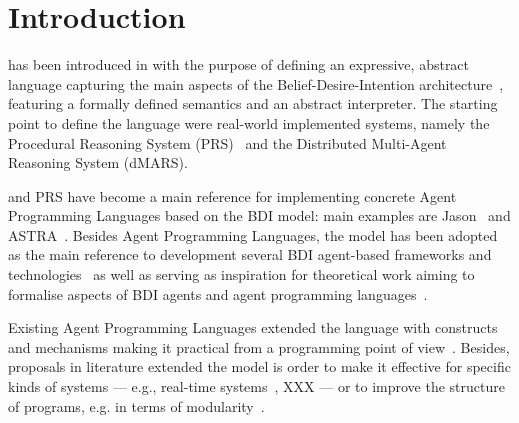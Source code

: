 \section{Introduction}
\label{sec:intro}


%
%
{\asl} has been introduced in \cite{Rao96}  with the purpose of defining an expressive, 
abstract language capturing the main aspects of the Belief-Desire-Intention architecture~\cite{Bratman88,Georgeff:1987:RRP:1863766.1863818}, featuring a formally defined semantics and an abstract interpreter.
%
The starting point to define the language were real-world implemented systems, namely the
Procedural Reasoning System (PRS)~\cite{Ingrand:1992:ARR:629535.629890} and the Distributed Multi-Agent Reasoning System (dMARS).
%

%
% 
{\asl}  and PRS have become a main reference for implementing concrete Agent Programming Languages 
based on the BDI model: 
%
main examples are Jason~\cite{jason06,bordini:07} and ASTRA~\cite{DBLP:conf/prima/CollierRL15}.
%
Besides Agent Programming Languages,  the {\asl}  model has been
adopted as the main reference to development several BDI agent-based
frameworks and technologies~\cite{BordiniMAPlpa,BordiniMAPlta} as well
as serving as inspiration for theoretical work aiming to formalise
aspects of BDI agents and agent programming
languages~\cite{SardinaThangCAN,LouiseAIL,BordiniMCAPL}.


%
%
Existing Agent Programming Languages extended the language with
constructs and mechanisms making it practical from a programming point
of view~\cite{jason06}.
%
Besides, proposals in literature extended the model is order to make
it effective for specific kinds of systems --- e.g., real-time
systems~\cite{Vikhorev:2011:APP:2030470.2030529}, XXX --- or to
improve the structure of programs, e.g. in terms of
modularity~\cite{Madden2010,Nunes2014}.

